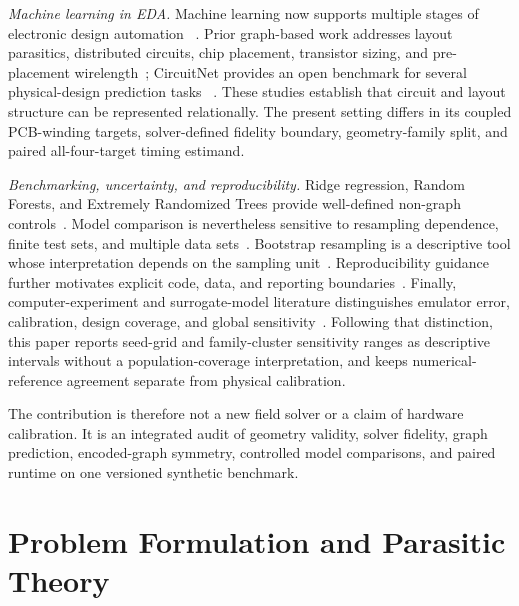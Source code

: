 \documentclass[journal]{IEEEtran}
\begin{document}
\textit{Machine learning in EDA.}
Machine learning now supports multiple stages of electronic design automation
~\cite{huang_survey}. Prior graph-based work addresses layout parasitics,
distributed circuits, chip placement, transistor sizing, and pre-placement
wirelength~\cite{paragraph,circuitgnn,mirhoseini,gcnrl,net2}; CircuitNet provides
an open benchmark for several physical-design prediction tasks
~\cite{circuitnet}. These studies establish that circuit and layout structure
can be represented relationally. The present setting differs in its coupled
PCB-winding targets, solver-defined fidelity boundary, geometry-family split,
and paired all-four-target timing estimand.

\textit{Benchmarking, uncertainty, and reproducibility.}
Ridge regression, Random Forests, and Extremely Randomized Trees provide
well-defined non-graph controls~\cite{ridge,randomforest,extratrees}. Model
comparison is nevertheless sensitive to resampling dependence, finite test
sets, and multiple data sets~\cite{nadeau,varoquaux,demsar}. Bootstrap
resampling is a descriptive tool whose interpretation depends on the sampling
unit~\cite{efron}. Reproducibility guidance further motivates explicit code,
data, and reporting boundaries~\cite{pineau}. Finally, computer-experiment and
surrogate-model literature distinguishes emulator error, calibration, design
coverage, and global sensitivity~\cite{sacks,kennedy,queipo,saltelli}. Following
that distinction, this paper reports seed-grid and family-cluster sensitivity
ranges as descriptive intervals without a population-coverage interpretation, and
keeps numerical-reference agreement separate from physical calibration.

The contribution is therefore not a new field solver or a claim of hardware
calibration. It is an integrated audit of geometry validity, solver fidelity,
graph prediction, encoded-graph symmetry, controlled model comparisons, and
paired runtime on one versioned synthetic benchmark.

\section{Problem Formulation and Parasitic Theory}
\end{document}
